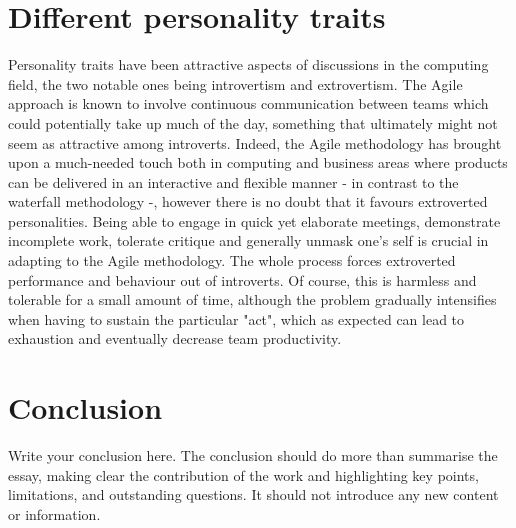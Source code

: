 \documentclass{scrartcl}
\begin{document}
\section{Different personality traits}
Personality traits have been attractive aspects of discussions in the computing field, the two notable ones being introvertism and extrovertism. The Agile approach is known to involve continuous communication between teams which could potentially take up much of the day, something that ultimately might not seem as attractive among introverts. Indeed, the Agile methodology has brought upon a much-needed touch both in computing and business areas where products can be delivered in an interactive and flexible manner - in contrast to the waterfall methodology -, however there is no doubt that it favours extroverted personalities. Being able to engage in quick yet elaborate meetings, demonstrate incomplete work, tolerate critique and generally unmask one's self is crucial in adapting to the Agile methodology. The whole process forces extroverted performance and behaviour out of introverts. Of course, this is harmless and tolerable for a small amount of time, although the problem gradually intensifies when having to sustain the particular "act", which as expected can lead to exhaustion and eventually decrease team productivity.

\section{Conclusion}

Write your conclusion here. The conclusion should do more than summarise the essay, making clear the contribution of the work and highlighting key points, limitations, and outstanding questions. It should not introduce any new content or information.



\end{document}
